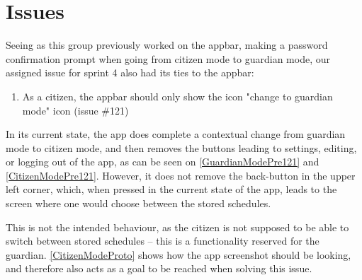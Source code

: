 \section{Issues}
Seeing as this group previously worked on the appbar, making a password confirmation prompt when going from citizen mode to guardian mode, our assigned issue for sprint 4 also had its ties to the appbar:

\begin{enumerate}
  \item As a citizen, the appbar should only show the icon "change to guardian mode" icon (issue \#121)
\end{enumerate}

In its current state, the app does complete a contextual change from guardian mode to citizen mode, and then removes the buttons leading to settings, editing, or logging out of the app, as can be seen on \autoref{GuardianModePre121} and \autoref{CitizenModePre121}.
However, it does not remove the back-button in the upper left corner, which, when pressed in the current state of the app, leads to the screen where one would choose between the stored schedules.


This is not the intended behaviour, as the citizen is not supposed to be able to switch between stored schedules -- this is a functionality reserved for the guardian.
\autoref{CitizenModeProto} shows how the app screenshot should be looking, and therefore also acts as a goal to be reached when solving this issue.

